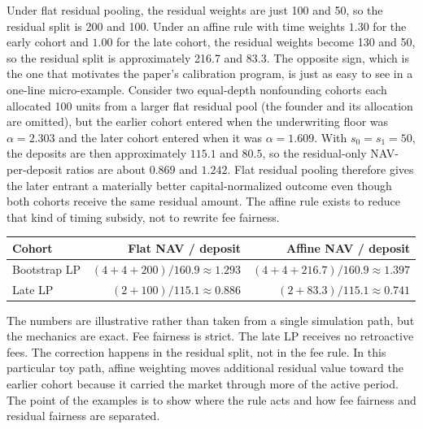 \documentclass[10pt]{article}
\begin{document}
Under flat residual pooling, the residual weights are just 100 and 50, so the residual split is 200 and 100. Under an affine rule with time weights $1.30$ for the early cohort and $1.00$ for the late cohort, the residual weights become 130 and 50, so the residual split is approximately 216.7 and 83.3. The opposite sign, which is the one that motivates the paper's calibration program, is just as easy to see in a one-line micro-example. Consider two equal-depth nonfounding cohorts each allocated 100 units from a larger flat residual pool (the founder and its allocation are omitted), but the earlier cohort entered when the underwriting floor was $\alpha=2.303$ and the later cohort entered when it was $\alpha=1.609$. With $s_0=s_1=50$, the deposits are then approximately $115.1$ and $80.5$, so the residual-only NAV-per-deposit ratios are about $0.869$ and $1.242$. Flat residual pooling therefore gives the later entrant a materially better capital-normalized outcome even though both cohorts receive the same residual amount. The affine rule exists to reduce that kind of timing subsidy, not to rewrite fee fairness.

\begin{center}
\begin{tabular}{lrr}
\toprule
Cohort & Flat NAV / deposit & Affine NAV / deposit \\
\midrule
Bootstrap LP & $(4 + 4 + 200)/160.9 \approx 1.293$ & $(4 + 4 + 216.7)/160.9 \approx 1.397$ \\
Late LP & $(2 + 100)/115.1 \approx 0.886$ & $(2 + 83.3)/115.1 \approx 0.741$ \\
\bottomrule
\end{tabular}
\end{center}

The numbers are illustrative rather than taken from a single simulation path, but the mechanics are exact. Fee fairness is strict. The late LP receives no retroactive fees. The correction happens in the residual split, not in the fee rule. In this particular toy path, affine weighting moves additional residual value toward the earlier cohort because it carried the market through more of the active period. The point of the examples is to show where the rule acts and how fee fairness and residual fairness are separated.
\end{document}
